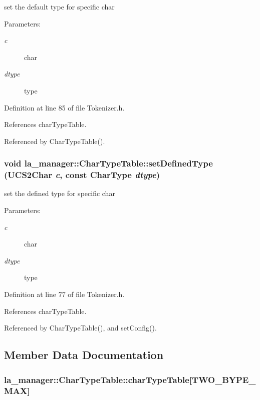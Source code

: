 set the default type for specific char 

\begin{Desc}
\item[Parameters:]
\begin{description}
\item[{\em c}]char \item[{\em dtype}]type \end{description}
\end{Desc}


Definition at line 85 of file Tokenizer.h.

References charTypeTable.

Referenced by CharTypeTable().\hypertarget{classla__manager_1_1CharTypeTable_de4d78b3913cb199ca359d989f73ab30}{
\subsubsection[{setDefinedType}]{\setlength{\rightskip}{0pt plus 5cm}void la\_\-manager::CharTypeTable::setDefinedType (UCS2Char {\em c}, \/  const {\bf CharType} {\em dtype})}}
\label{classla__manager_1_1CharTypeTable_de4d78b3913cb199ca359d989f73ab30}


set the defined type for specific char 

\begin{Desc}
\item[Parameters:]
\begin{description}
\item[{\em c}]char \item[{\em dtype}]type \end{description}
\end{Desc}


Definition at line 77 of file Tokenizer.h.

References charTypeTable.

Referenced by CharTypeTable(), and setConfig().

\subsection{Member Data Documentation}
\hypertarget{classla__manager_1_1CharTypeTable_a310585720c29aff0eed743865ead8fc}{
\subsubsection[{charTypeTable}]{ {\bf la\_\-manager::CharTypeTable::charTypeTable}\mbox{[}{\bf TWO\_\-BYPE\_\-MAX}\mbox{]}}}
\label{classla__manager_1_1CharTypeTable_a310585720c29aff0eed743865ead8fc}





